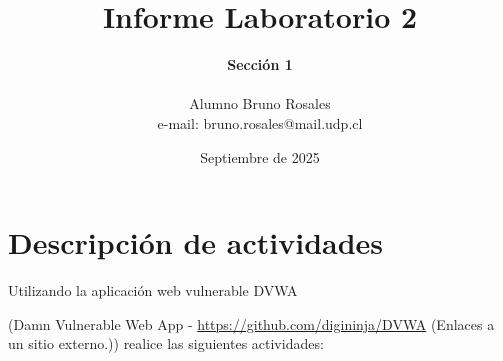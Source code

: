 \documentclass[letter,12pt]{article}
\begin{document}
%
   \title{\Huge{Informe Laboratorio 2}}

   \author{\textbf{Sección 1} \\  \\Alumno Bruno Rosales \\ e-mail: bruno.rosales@mail.udp.cl}
          
   \date{Septiembre de 2025}

   \maketitle
   
   \tableofcontents
 
  \newpage
  

\section{Descripción de actividades}
Utilizando la aplicación web vulnerable DVWA

(Damn Vulnerable Web App - \href{https://github.com/digininja/DVWA}{https://github.com/digininja/DVWA} (Enlaces a un sitio externo.)) realice las siguientes actividades:
\end{document}

